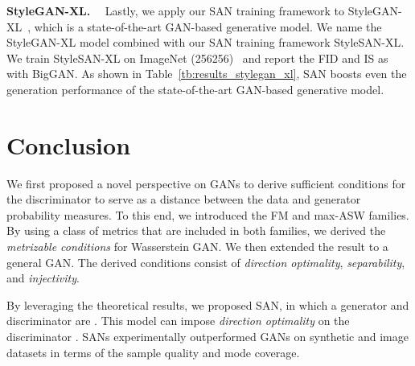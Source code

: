 \textbf{StyleGAN-XL.}~~
Lastly, we apply our SAN training framework to StyleGAN-XL~\citep{sauer2022stylegan}, which is a state-of-the-art GAN-based generative model. We name the StyleGAN-XL model combined with our SAN training framework StyleSAN-XL. We train StyleSAN-XL on ImageNet (256256)~\citep{russakovsky2015imagenet} and report the FID and IS as with BigGAN. As shown in Table~\ref{tb:results_stylegan_xl}, SAN boosts even the generation performance of the state-of-the-art GAN-based generative model.

\section{Conclusion}
We first proposed a novel perspective on GANs to derive sufficient conditions for the discriminator to serve as a distance between the data and generator probability measures. To this end, we introduced the FM and max-ASW families. By using a class of metrics that are included in both families, we derived the \textit{metrizable conditions} for Wasserstein GAN. We then extended the result to a general GAN. The derived conditions consist of \textit{direction optimality}, \textit{separability}, and \textit{injectivity}. 

By leveraging the theoretical results, we proposed SAN, in which a generator and discriminator are .
This model can impose \textit{direction optimality} on the discriminator . SANs experimentally outperformed GANs on synthetic and image datasets in terms of the sample quality and mode coverage.
